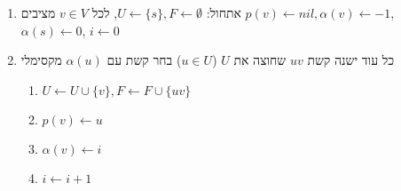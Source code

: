 \begin{enumerate}
\item
אתחול:
$U \leftarrow \{s\}, F \leftarrow \emptyset$, 
לכל 
$v \in V$
מציבים
$p(v) \leftarrow nil, \alpha(v) \leftarrow -1$,
$\alpha(s) \leftarrow 0$,
$i \leftarrow 0$
\item 
כל עוד ישנה קשת 
$uv$
שחוצה את $U$ 
($u \in U$)
בחר קשת עם 
$\alpha(u)$
מקסימלי
	\begin{enumerate}
	\item
	$U \leftarrow U \cup \{v\}, F \leftarrow F \cup \{uv\}$
	\item
	$p(v) \leftarrow u$
	\item
	$\alpha(v) \leftarrow i$
	\item
	$i \leftarrow i + 1$
	\end{enumerate}
\end{enumerate}

